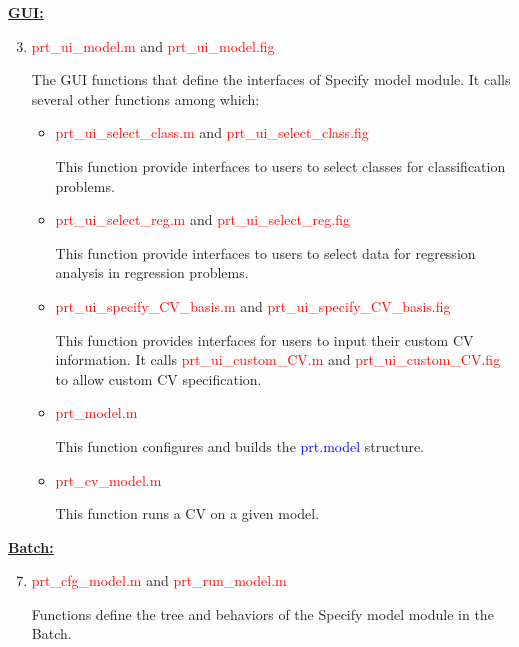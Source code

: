 \noindent \textbf{\underline{GUI:}}



\begin{enumerate}
\setcounter{enumi}{2}

\item \textcolor{red}{prt\_ui\_model.m}  and \textcolor{red}{prt\_ui\_model.fig}

The GUI functions that define the interfaces of Specify model module. It calls several other functions among which:

\begin{itemize}
\item \textcolor{red}{prt\_ui\_select\_class.m} and \textcolor{red}{prt\_ui\_select\_class.fig}

This function provide interfaces to users to select classes for classification problems.


\item \textcolor{red}{prt\_ui\_select\_reg.m} and \textcolor{red}{prt\_ui\_select\_reg.fig}

This function provide interfaces to users to select data for regression analysis in regression problems.

\item \textcolor{red}{prt\_ui\_specify\_CV\_basis.m} and \textcolor{red}{prt\_ui\_specify\_CV\_basis.fig}

This function provides interfaces for users to input their custom CV information. It calls \textcolor{red}{prt\_ui\_custom\_CV.m} and \textcolor{red}{prt\_ui\_custom\_CV.fig} to allow custom CV specification.

\item \textcolor{red}{prt\_model.m}

This function configures and builds the \textcolor{blue}{prt.model} structure.

\item \textcolor{red}{prt\_cv\_model.m}

This function runs a CV on a given model.

\end{itemize}


\end{enumerate}


\noindent \textbf{\underline{Batch:}}


\begin{enumerate}
\setcounter{enumi}{6}

\item \textcolor{red}{prt\_cfg\_model.m} and \textcolor{red}{prt\_run\_model.m}

Functions define the tree and behaviors of the Specify model module in the Batch.


\end{enumerate}




